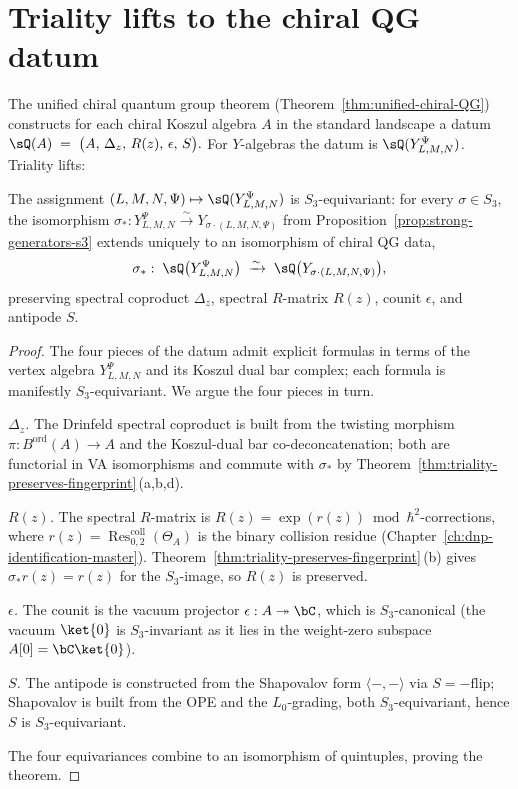 \section{Triality lifts to the chiral QG datum}
\label{sec:triality-chiral-qg}

The unified chiral quantum group theorem
(Theorem~\ref{thm:unified-chiral-QG}) constructs for each chiral
Koszul algebra $A$ in the standard landscape a datum
\(
\sQ(A) \;=\; \bigl(A,\, \Delta_z,\, R(z),\, \epsilon,\, S\bigr).
\)
For $Y$-algebras the datum is
$\sQ(Y_{L,M,N}^\Psi)$. Triality lifts:

\begin{theorem}[$\sQ$ is $S_3$-equivariant]
\label{thm:triality-lifts-to-chiral-qg}
The assignment $(L,M,N,\Psi) \mapsto \sQ(Y_{L,M,N}^\Psi)$ is
$S_3$-equivariant: for every $\sigma \in S_3$, the isomorphism
$\sigma_*: Y_{L,M,N}^\Psi \xrightarrow{\sim}
Y_{\sigma\cdot(L,M,N,\Psi)}$
from Proposition~\ref{prop:strong-generators-s3} extends uniquely
to an isomorphism of chiral QG data,
\[
\sigma_*:\; \sQ\bigl(Y_{L,M,N}^\Psi\bigr)
\;\xrightarrow{\sim}\;
\sQ\bigl(Y_{\sigma\cdot(L,M,N,\Psi)}\bigr),
\]
preserving spectral coproduct $\Delta_z$, spectral $R$-matrix
$R(z)$, counit $\epsilon$, and antipode $S$.
\end{theorem}

\begin{proof}
The four pieces of the datum admit explicit formulas in terms of the
vertex algebra $Y_{L,M,N}^\Psi$ and its Koszul dual bar complex;
each formula is manifestly $S_3$-equivariant. We argue the four
pieces in turn.

\smallskip
\emph{$\Delta_z$.} The Drinfeld spectral coproduct is built from
the twisting morphism
$\pi: B^{\mathrm{ord}}(A) \to A$ and the Koszul-dual bar
co-deconcatenation; both are functorial in VA isomorphisms and
commute with $\sigma_*$ by Theorem~\ref{thm:triality-preserves-fingerprint}\,(a,b,d).

\smallskip
\emph{$R(z)$.} The spectral $R$-matrix is
$R(z) = \exp(r(z)) \bmod \hbar^2$-corrections, where
$r(z) = \operatorname{Res}^{\mathrm{coll}}_{0,2}(\Theta_A)$ is the
binary collision residue (Chapter~\ref{ch:dnp-identification-master}).
Theorem~\ref{thm:triality-preserves-fingerprint}\,(b) gives
$\sigma_* r(z) = r(z)$ for the $S_3$-image, so $R(z)$ is preserved.

\smallskip
\emph{$\epsilon$.} The counit is the vacuum projector
$\epsilon: A \twoheadrightarrow \bC$, which is $S_3$-canonical
(the vacuum $\ket{0}$ is $S_3$-invariant as it lies in the
weight-zero subspace $A[0] = \bC \ket{0}$).

\smallskip
\emph{$S$.} The antipode is constructed from the Shapovalov form
$\langle -, - \rangle$ via $S = -\text{flip}$; Shapovalov is built
from the OPE and the $L_0$-grading, both $S_3$-equivariant, hence
$S$ is $S_3$-equivariant.

The four equivariances combine to an isomorphism of quintuples,
proving the theorem.
\end{proof}

